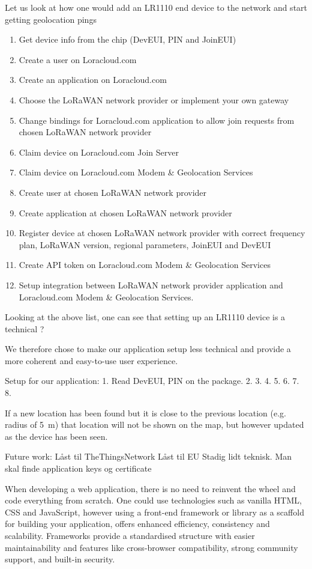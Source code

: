 Let us look at how one would add an LR1110 end device to the network and start getting geolocation pings
\begin{enumerate}
    \item Get device info from the chip (\ac{DevEUI}, PIN and \ac{JoinEUI})
    \item Create a user on Loracloud.com 
    \item Create an application on Loracloud.com
    \item Choose the \ac{LoRaWAN} network provider or implement your own gateway
    \item Change bindings for Loracloud.com application to allow join requests from chosen \ac{LoRaWAN} network provider
    \item Claim device on Loracloud.com Join Server
    \item Claim device on Loracloud.com Modem \& Geolocation Services
    \item Create user at chosen \ac{LoRaWAN} network provider
    \item Create application at chosen \ac{LoRaWAN} network provider
    \item Register device at chosen \ac{LoRaWAN} network provider with correct frequency plan, \ac{LoRaWAN} version, regional parameters, \ac{JoinEUI} and \ac{DevEUI}
    \item Create API token on Loracloud.com Modem \& Geolocation Services
    \item Setup integration between \ac{LoRaWAN} network provider application and Loracloud.com Modem \& Geolocation Services.
\end{enumerate}

Looking at the above list, one can see that setting up an LR1110 device is a technical ?

We therefore chose to make our application setup less technical and provide a more coherent and easy-to-use user experience.

Setup for our application:
1. Read \ac{DevEUI}, PIN on the package.
2. 
3.
4.
5.
6.
7.
8.

If a new location has been found but it is close to the previous location (e.g. radius of \SI{5}{\meter}) that location will not be shown on the map, but however updated as the device has been seen.

Future work:
Låst til TheThingsNetwork
Låst til EU
Stadig lidt teknisk. Man skal finde application keys og certificate

When developing a web application, there is no need to reinvent the wheel and code everything from scratch. One could use technologies such as vanilla HTML, CSS and JavaScript, however using a front-end framework or library as a scaffold for building your application, offers enhanced efficiency, consistency and scalability. Frameworks provide a standardised structure with easier maintainability and features like cross-browser compatibility, strong community support, and built-in security.

